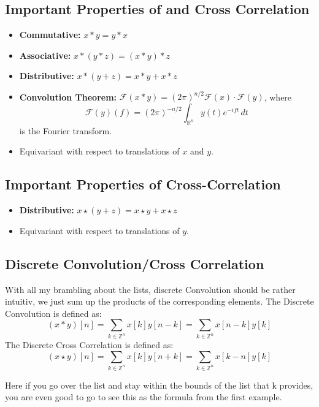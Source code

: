 \documentclass[a4paper]{article}
\begin{document}
\subsection*{Important Properties of  and Cross Correlation}

\begin{itemize}
    \item \textbf{Commutative:} \( x * y = y * x \)
    \item \textbf{Associative:} \( x * (y * z) = (x * y) * z \)
    \item \textbf{Distributive:} \( x * (y + z) = x * y + x * z \)
    \item \textbf{Convolution Theorem:} \( \mathcal{F}(x * y) = (2\pi)^{n/2} \mathcal{F}(x) \cdot \mathcal{F}(y) \), where
    \[
    \mathcal{F}(y)(f) = (2\pi)^{-n/2} \int_{\mathbb{R}^n} y(t) e^{-i f t} \, dt
    \]
    is the Fourier transform.
    \item Equivariant with respect to translations of \( x \) and \( y \).
\end{itemize}

\subsection*{Important Properties of Cross-Correlation}

\begin{itemize}
    \item \textbf{Distributive:} \( x \star (y + z) = x \star y + x \star z \)
    \item Equivariant with respect to translations of \( y \).
\end{itemize}
\subsection{Discrete Convolution/Cross Correlation}
With all my brambling about the lists, discrete Convolution should be rather intuitiv, we just sum up the products of the corresponding elements. The Discrete Convolution is defined as:
\[
(x * y)[n] = \sum_{k \in \mathbb{Z}^{n}} x[k] y[n - k] = \sum_{k \in \mathbb{Z}^{n}} x[n - k] y[k]  
\]
The Discrete Cross Correlation is defined as:
\[
(x \star y)[n] = \sum_{k \in \mathbb{Z}^{n}} x[k] y[n + k] = \sum_{k \in \mathbb{Z}^{n}} x[k-n] y[k]
\]

Here if you go over the list and stay within the bounds of the list that k provides, you are even good to go to see this as the formula from the first example. 
\end{document}
